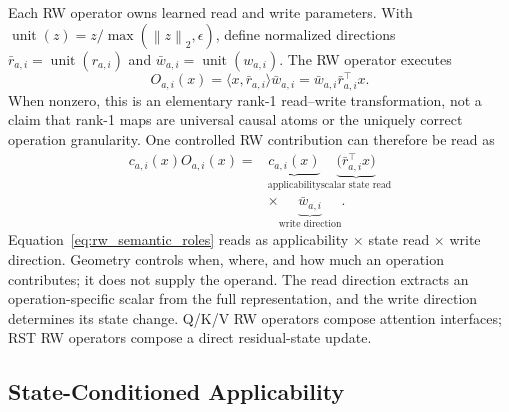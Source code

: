 \documentclass{article}
\newcommand{\norm}[1]{\left\lVert #1 \right\rVert}
\begin{document}
Each RW operator owns learned read and write parameters. With
\(\operatorname{unit}(z)=z/\max(\norm{z}_2,\epsilon)\), define normalized
directions \(\bar r_{a,i}=\operatorname{unit}(r_{a,i})\) and
\(\bar w_{a,i}=\operatorname{unit}(w_{a,i})\). The RW operator executes
\begin{equation}
O_{a,i}(x)=\langle x,\bar r_{a,i}\rangle\bar w_{a,i}
=\bar w_{a,i}\bar r_{a,i}^{\top}x.
\label{eq:rw_operator}
\end{equation}
When nonzero, this is an elementary rank-1 read--write transformation, not a
claim that rank-1 maps are universal causal atoms or the uniquely correct
operation granularity.
One controlled RW contribution can therefore be read as
\begin{equation}
\begin{aligned}
c_{a,i}(x)O_{a,i}(x)
={}&\underbrace{c_{a,i}(x)}_{\text{applicability}}
\underbrace{\big(\bar r_{a,i}^{\top}x\big)}_{\text{scalar state read}}\\[-0.1em]
&\times\underbrace{\bar w_{a,i}}_{\text{write direction}}.
\end{aligned}
\label{eq:rw_semantic_roles}
\end{equation}
Equation~\ref{eq:rw_semantic_roles} reads as applicability \(\times\) state read
\(\times\) write direction. Geometry controls when, where, and how much an
operation contributes; it does not supply the operand. The read direction extracts
an operation-specific scalar from the full representation, and the write direction
determines its state change. Q/K/V RW operators compose attention interfaces; RST
RW operators compose a direct residual-state update.

\subsection{State-Conditioned Applicability}
\label{sec:applicability}
\end{document}
